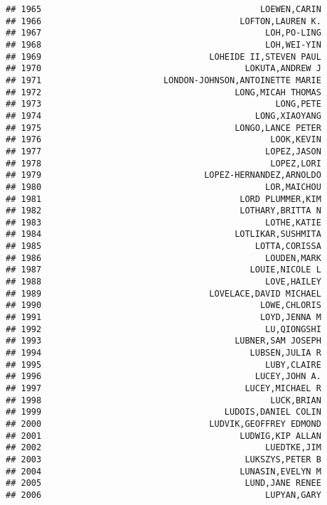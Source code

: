 \documentclass[
]{article}
\begin{document}
\begin{verbatim}
## 1965                                           LOEWEN,CARIN
## 1966                                       LOFTON,LAUREN K.
## 1967                                            LOH,PO-LING
## 1968                                            LOH,WEI-YIN
## 1969                                 LOHEIDE II,STEVEN PAUL
## 1970                                        LOKUTA,ANDREW J
## 1971                        LONDON-JOHNSON,ANTOINETTE MARIE
## 1972                                      LONG,MICAH THOMAS
## 1973                                              LONG,PETE
## 1974                                          LONG,XIAOYANG
## 1975                                      LONGO,LANCE PETER
## 1976                                             LOOK,KEVIN
## 1977                                            LOPEZ,JASON
## 1978                                             LOPEZ,LORI
## 1979                                LOPEZ-HERNANDEZ,ARNOLDO
## 1980                                            LOR,MAICHOU
## 1981                                       LORD PLUMMER,KIM
## 1982                                       LOTHARY,BRITTA N
## 1983                                            LOTHE,KATIE
## 1984                                      LOTLIKAR,SUSHMITA
## 1985                                          LOTTA,CORISSA
## 1986                                            LOUDEN,MARK
## 1987                                         LOUIE,NICOLE L
## 1988                                            LOVE,HAILEY
## 1989                                 LOVELACE,DAVID MICHAEL
## 1990                                           LOWE,CHLORIS
## 1991                                           LOYD,JENNA M
## 1992                                            LU,QIONGSHI
## 1993                                      LUBNER,SAM JOSEPH
## 1994                                         LUBSEN,JULIA R
## 1995                                            LUBY,CLAIRE
## 1996                                          LUCEY,JOHN A.
## 1997                                        LUCEY,MICHAEL R
## 1998                                             LUCK,BRIAN
## 1999                                    LUDOIS,DANIEL COLIN
## 2000                                 LUDVIK,GEOFFREY EDMOND
## 2001                                       LUDWIG,KIP ALLAN
## 2002                                            LUEDTKE,JIM
## 2003                                        LUKSZYS,PETER B
## 2004                                       LUNASIN,EVELYN M
## 2005                                        LUND,JANE RENEE
## 2006                                            LUPYAN,GARY

\end{verbatim}
\end{document}

